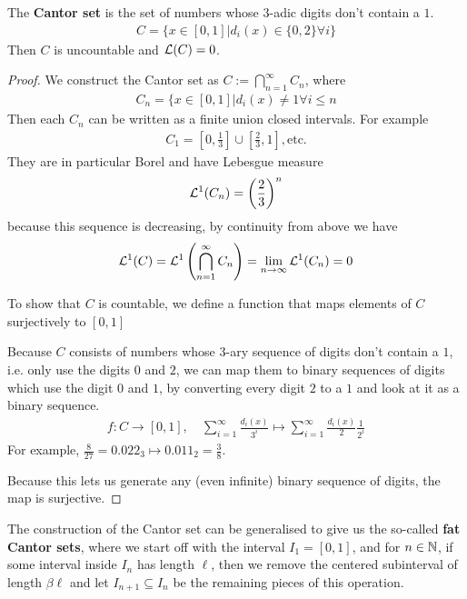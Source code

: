 \begin{prop}[]  \label{prop:triadic-cantor-set}
The \textbf{Cantor set} is the set of numbers whose $3$-adic digits don't contain a $1$.
\begin{align*}
  C = \{x \in [0,1] \big\vert d_i(x) \in \{0,2\} \forall i\}
\end{align*}
Then $C$ is uncountable and $\mathcal{L}(C) = 0$.
\end{prop}
\begin{proof}
  We construct the Cantor set as $C := \bigcap_{n = 1}^{\infty}C_n$, where
  \begin{align*}
    C_n = \{x \in [0,1] \big\vert d_i(x) \neq 1 \forall i \leq n
  \end{align*}
  Then each $C_n$ can be written as a finite union closed intervals. For example
  \begin{align*}
    C_1 = \left[0, \frac{1}{3}\right] \cup \left[\frac{2}{3},1\right], \text{etc.}
  \end{align*}
  They are in particular Borel and have Lebesgue measure
  \begin{align*}
    \mathcal{L}^{1}(C_n) = \left(
      \frac{2}{3}
    \right)^{n}
  \end{align*}
  because this sequence is decreasing, by continuity from above we have
  \begin{align*}
    \mathcal{L}^{1}(C) = \mathcal{L}^{1} \left(
      \bigcap_{n=1}^{\infty}C_n
    \right)
    =
    \lim_{n \to \infty} \mathcal{L}^{1}(C_n) = 0
  \end{align*}

  To show that $C$ is countable, we define a function that maps elements of $C$ surjectively to $[0,1]$


  Because $C$ consists of numbers whose $3$-ary sequence of digits don't contain a $1$, i.e. only use the digits $0$ and $2$, 
  we can map them to binary sequences of digits which use the digit $0$ and $1$, by converting every digit $2$ to a $1$ and look at it as a binary sequence.
  \begin{align*}
    f: C \to [0,1], \quad \sum_{i=1}^{\infty} \frac{d_i(x)}{3^{i}} \mapsto \sum_{i=1}^{\infty} \frac{d_i(x)}{2} \frac{1}{2^{i}}
  \end{align*}
  For example,
  $
    \frac{8}{27} = 0.022_3 \mapsto 0.011_2 = \frac{3}{8} .
  $
  
  Because this lets us generate any (even infinite) binary sequence of digits, the map is surjective. 
\end{proof}


The construction of the Cantor set can be generalised to give us the so-called \textbf{fat Cantor sets}, where we start off with the interval $I_1 = [0,1]$, and for $n \in \mathbb{N}$, if some interval inside $I_n$ has length $\ell$, then we remove the centered subinterval of length $\beta \ell$ and let $I_{n+1} \subseteq I_n$ be the remaining pieces of this operation.

